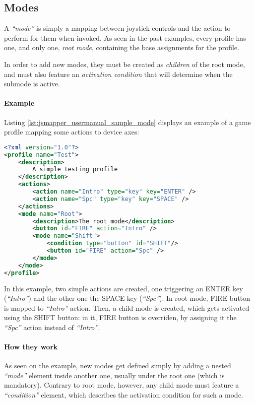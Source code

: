 \subsection{Modes}
A \emph{``mode''} is simply a mapping between joystick controls and the action to perform for them when invoked. As seen in the past examples, every profile has one, and only one, \emph{root mode}, containing the base assignments for the profile.

In order to add new modes, they must be created as \emph{children} of the root mode, and must also feature an \emph{activation condition} that will determine when the submode is active.

\paragraph{Example}
Listing \ref{lst:jsmapper_usermanual_sample_mode} displays an example of a game profile mapping some actions to device axes:
\begin{lstlisting}[language=XML,caption={Modes},label={lst:jsmapper_usermanual_sample_mode}]
<?xml version="1.0"?>
<profile name="Test">
	<description>
		A simple testing profile
	</description>
	<actions>
		<action name="Intro" type="key" key="ENTER" />
		<action name="Spc" type="key" key="SPACE" />
	</actions>
	<mode name="Root">
		<description>The root mode</description>
		<button id="FIRE" action="Intro" />
		<mode name="Shift">
			<condition type="button" id="SHIFT"/>
			<button id="FIRE" action="Spc" />
		</mode>
	</mode>
</profile>
\end{lstlisting}

In this example, two simple actions are created, one triggering an ENTER key (\emph{``Intro''}) and the other one the SPACE key (\emph{``Spc''}). In root mode, FIRE button is mapped to \emph{``Intro''} action. Then, a child mode is created, which gets activated using the SHIFT button: in it, FIRE button is overriden, by assigning it the \emph{``Spc''} action instead of \emph{``Intro''}.

\paragraph{How they work}
As seen on the example, new modes get defined simply by adding a nested \emph{``mode''} element inside another one, usually under the root one (which is mandatory). Contrary to root mode, however, any child mode must feature a \emph{``condition''} element, which describes the activation condition for such a mode. 

